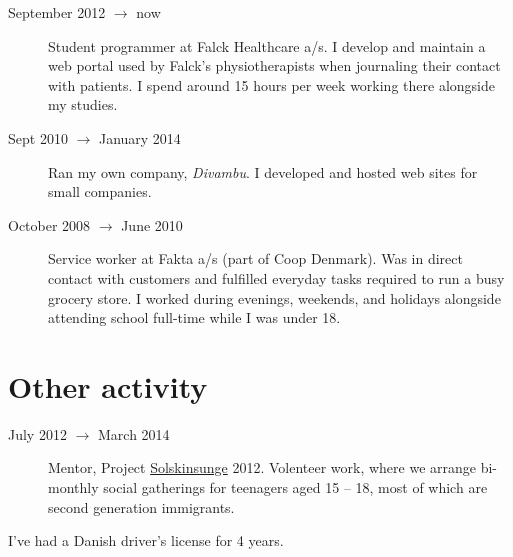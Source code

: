 \documentclass[margin,line,a4paper]{resume}
\begin{document}
\begin{resume}
\begin{description}
  \item[September 2012 $\rightarrow$ now] Student programmer at Falck
  Healthcare a/s. I develop and maintain a web portal used by
  Falck's physiotherapists when journaling their contact with patients.
  I spend around 15 hours per week working there alongside my studies.

  \item[Sept 2010 $\rightarrow$ January 2014] Ran my own company,
    \emph{Divambu}. I developed and hosted web sites for small companies.

  \item[October 2008 $\rightarrow$ June 2010] Service worker at
    Fakta a/s (part of Coop Denmark). Was in direct contact with customers
    and fulfilled everyday tasks required to run a busy grocery store. I
    worked during evenings, weekends, and holidays alongside attending
    school full-time while I was under 18.
\end{description}

\section{\mysidestyle Other activity}\vspace{1mm}
\begin{description}
  \item[July 2012 $\rightarrow$ March 2014] Mentor, Project
    \href{http://www.urk.dk/solskinsunge/}{Solskinsunge} 2012. Volenteer
    work, where we arrange bi-monthly social gatherings for teenagers aged
    15 -- 18, most of which are second generation immigrants.
\end{description}


I've had a Danish driver's license for 4 years.


\end{resume}
\end{document}
